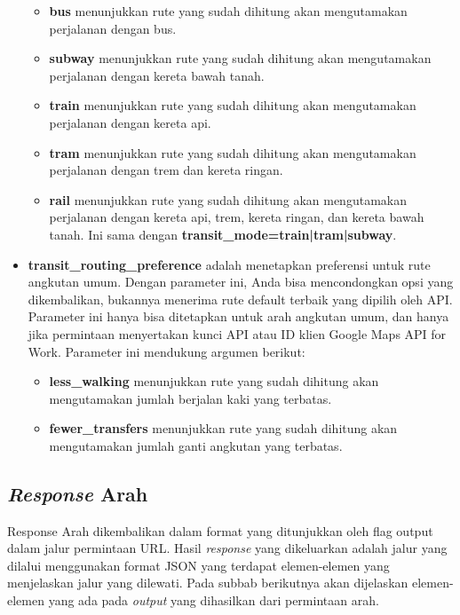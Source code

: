 \begin{itemize}
	\begin{itemize}
		\item \textbf{bus} menunjukkan rute yang sudah dihitung akan mengutamakan perjalanan dengan bus.
		\item \textbf{subway} menunjukkan rute yang sudah dihitung akan mengutamakan perjalanan dengan kereta bawah tanah.
		\item \textbf{train} menunjukkan rute yang sudah dihitung akan mengutamakan perjalanan dengan kereta api.
		\item \textbf{tram} menunjukkan rute yang sudah dihitung akan mengutamakan perjalanan dengan trem dan kereta ringan.
		\item \textbf{rail} menunjukkan rute yang sudah dihitung akan mengutamakan perjalanan dengan kereta api, trem, kereta ringan, dan kereta bawah tanah. Ini sama dengan \textbf{transit\_mode=train|tram|subway}.
	\end{itemize}
	\item \textbf{transit\_routing\_preference} adalah menetapkan preferensi untuk rute angkutan umum. Dengan parameter ini, Anda bisa mencondongkan opsi yang dikembalikan, bukannya menerima rute default terbaik yang dipilih oleh API. Parameter ini hanya bisa ditetapkan untuk arah angkutan umum, dan hanya jika permintaan menyertakan kunci API atau ID klien Google Maps API for Work. Parameter ini mendukung argumen berikut:
	\begin{itemize}
		\item \textbf{less\_walking} menunjukkan rute yang sudah dihitung akan mengutamakan jumlah berjalan kaki yang terbatas.
		\item \textbf{fewer\_transfers} menunjukkan rute yang sudah dihitung akan mengutamakan jumlah ganti angkutan yang terbatas.
	\end{itemize}
\end{itemize}

\subsection{\textit{Response} Arah}
\label{subsec:responsegoogledir}

Response Arah dikembalikan dalam format yang ditunjukkan oleh flag output dalam jalur permintaan URL. Hasil \textit{response} yang dikeluarkan adalah jalur yang dilalui menggunakan format JSON yang terdapat elemen-elemen yang menjelaskan jalur yang dilewati. Pada subbab berikutnya akan dijelaskan elemen-elemen yang ada pada \textit{output} yang dihasilkan dari permintaan arah.

